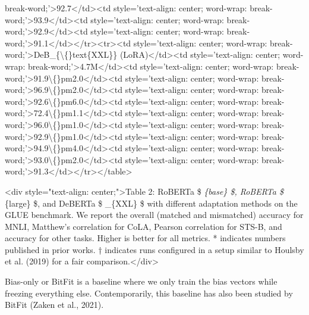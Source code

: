 \documentclass[conference]{IEEEtran}
\begin{document}
break-word;'\textgreater{}92.7\textless{}/td\textgreater{}\textless{}td style='text-align: center; word-wrap: break-word;'\textgreater{}93.9\textless{}/td\textgreater{}\textless{}td style='text-align: center; word-wrap: break-word;'\textgreater{}92.9\textless{}/td\textgreater{}\textless{}td style='text-align: center; word-wrap: break-word;'\textgreater{}91.1\textless{}/td\textgreater{}\textless{}/tr\textgreater{}\textless{}tr\textgreater{}\textless{}td style='text-align: center; word-wrap: break-word;'\textgreater{}DeB\_\{\textbackslash\{\}text\{XXL\}\} (LoRA)\textless{}/td\textgreater{}\textless{}td style='text-align: center; word-wrap: break-word;'\textgreater{}4.7M\textless{}/td\textgreater{}\textless{}td style='text-align: center; word-wrap: break-word;'\textgreater{}91.9\textbackslash\{\}pm2.0\textless{}/td\textgreater{}\textless{}td style='text-align: center; word-wrap: break-word;'\textgreater{}96.9\textbackslash\{\}pm2.0\textless{}/td\textgreater{}\textless{}td style='text-align: center; word-wrap: break-word;'\textgreater{}92.6\textbackslash\{\}pm6.0\textless{}/td\textgreater{}\textless{}td style='text-align: center; word-wrap: break-word;'\textgreater{}72.4\textbackslash\{\}pm1.1\textless{}/td\textgreater{}\textless{}td style='text-align: center; word-wrap: break-word;'\textgreater{}96.0\textbackslash\{\}pm1.0\textless{}/td\textgreater{}\textless{}td style='text-align: center; word-wrap: break-word;'\textgreater{}92.9\textbackslash\{\}pm1.0\textless{}/td\textgreater{}\textless{}td style='text-align: center; word-wrap: break-word;'\textgreater{}94.9\textbackslash\{\}pm4.0\textless{}/td\textgreater{}\textless{}td style='text-align: center; word-wrap: break-word;'\textgreater{}93.0\textbackslash\{\}pm2.0\textless{}/td\textgreater{}\textless{}td style='text-align: center; word-wrap: break-word;'\textgreater{}91.3\textless{}/td\textgreater{}\textless{}/tr\textgreater{}\textless{}/table\textgreater{}

\textless{}div style="text-align: center;"\textgreater{}Table 2: RoBERTa \$ \textit{\{base\} \$, RoBERTa \$ }\{large\} \$, and DeBERTa \$ \_\{XXL\} \$ with different adaptation methods on the GLUE benchmark. We report the overall (matched and mismatched) accuracy for MNLI, Matthew's correlation for CoLA, Pearson correlation for STS-B, and accuracy for other tasks. Higher is better for all metrics. * indicates numbers published in prior works. † indicates runs configured in a setup similar to Houlsby et al. (2019) for a fair comparison.\textless{}/div\textgreater{}

Bias-only or BitFit is a baseline where we only train the bias vectors while freezing everything else. Contemporarily, this baseline has also been studied by BitFit (Zaken et al., 2021).
\end{document}
